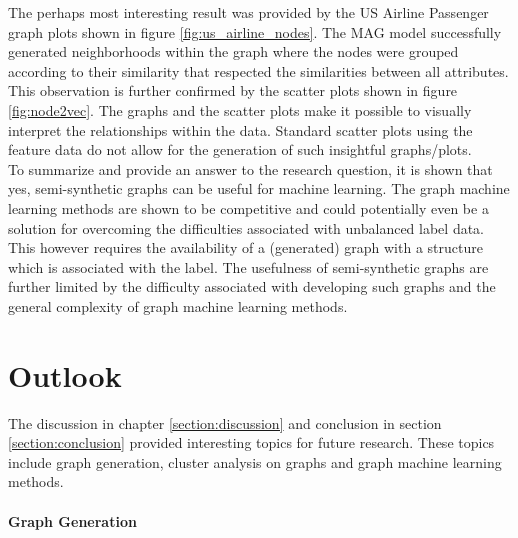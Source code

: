   \noindent The perhaps most interesting result was provided by the US Airline
  Passenger graph plots shown in figure \ref{fig:us_airline_nodes}. The MAG 
  model successfully generated neighborhoods within the graph where the nodes 
  were grouped according to their similarity that respected the similarities
  between all attributes. This observation is further confirmed by the scatter 
  plots shown in figure \ref{fig:node2vec}. The graphs and the scatter plots
  make it possible to visually interpret the relationships within the data. 
  Standard scatter plots using the feature data do not allow for the generation 
  of such insightful graphs/plots. \\

  \noindent To summarize and provide an answer to the research question, it is
  shown that yes, semi-synthetic graphs can be useful for machine learning. The
  graph machine learning methods are shown to be competitive and could
  potentially even be a solution for overcoming the difficulties associated
  with unbalanced label data. This however requires the availability of a
  (generated) graph with a structure which is associated with the label. The 
  usefulness of semi-synthetic graphs are further limited by the difficulty
  associated with developing such graphs and the general complexity of graph
  machine learning methods. 

  \section{Outlook}

  The discussion in chapter \ref{section:discussion} and conclusion in section
  \ref{section:conclusion} provided interesting topics for future research.
  These topics include graph generation, cluster analysis on graphs and graph 
  machine learning methods. 

  \paragraph{Graph Generation} \mbox{}
  
